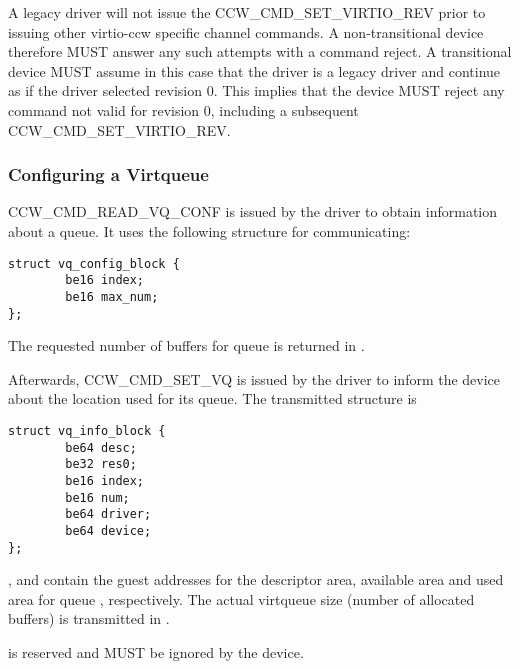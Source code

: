 A legacy driver will not issue the CCW_CMD_SET_VIRTIO_REV prior to
issuing other virtio-ccw specific channel commands. A non-transitional
device therefore MUST answer any such attempts with a command reject.
A transitional device MUST assume in this case that the driver is a
legacy driver and continue as if the driver selected revision 0. This
implies that the device MUST reject any command not valid for revision
0, including a subsequent CCW_CMD_SET_VIRTIO_REV.

\subsubsection{Configuring a Virtqueue}\label{sec:Virtio Transport Options / Virtio over channel I/O / Device Initialization / Configuring a Virtqueue}

CCW_CMD_READ_VQ_CONF is issued by the driver to obtain information
about a queue. It uses the following structure for communicating:

\begin{lstlisting}
struct vq_config_block {
        be16 index;
        be16 max_num;
};
\end{lstlisting}

The requested number of buffers for queue  is returned in
.

Afterwards, CCW_CMD_SET_VQ is issued by the driver to inform the
device about the location used for its queue. The transmitted
structure is

\begin{lstlisting}
struct vq_info_block {
        be64 desc;
        be32 res0;
        be16 index;
        be16 num;
        be64 driver;
        be64 device;
};
\end{lstlisting}

,  and  contain the guest
addresses for the descriptor area,
available area and used area for queue , respectively. The actual
virtqueue size (number of allocated buffers) is transmitted in .


 is reserved and MUST be ignored by the device.

